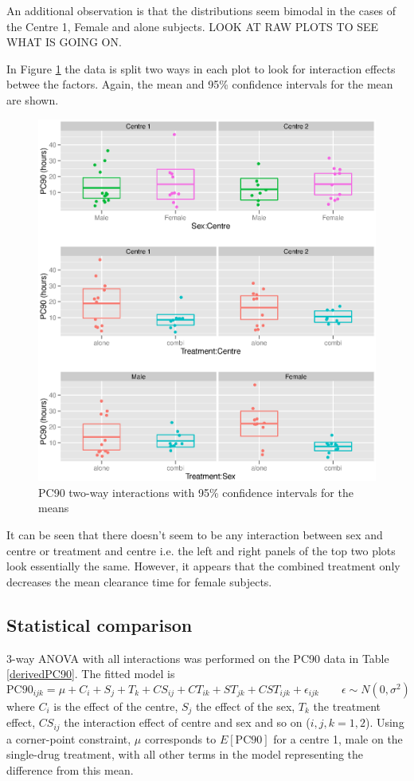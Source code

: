 An additional observation is that the distributions seem bimodal in the cases of the Centre 1, Female and alone subjects. LOOK AT RAW PLOTS TO SEE WHAT IS GOING ON.

In Figure \ref{pc90interaction} the data is split two ways in each plot to look for interaction effects betwee the factors. Again, the mean and 95\% confidence intervals for the mean are shown.
\begin{figure}[ht]
\includegraphics[width=6.5in]{pc90interaction.eps} 
\caption{PC90 two-way interactions with 95\% confidence intervals for the means}
\label{pc90interaction}
\end{figure}

It can be seen that there doesn't seem to be any interaction between sex and centre or treatment and centre i.e. the left and right panels of the top two plots look essentially the same. However, it appears that the combined treatment only decreases the mean clearance time for female subjects.
\subsection{Statistical comparison}
3-way ANOVA with all interactions was performed on the PC90 data in Table \ref{derivedPC90}. The fitted model is
\begin{equation}
\mathrm{PC}90_{ijk}=\mu+C_i+S_j+T_k+CS_{ij}+CT_{ik}+ST_{jk}+CST_{ijk}+\epsilon_{ijk}\quad\quad\epsilon\sim N(0,\sigma^2)\label{full}
\end{equation}
where $C_i$ is the effect of the centre, $S_j$ the effect of the sex, $T_k$ the treatment effect, $CS_{ij}$ the interaction effect of centre and sex and so on ($i,j,k=1,2$). Using a corner-point constraint, $\mu$ corresponds to $E[\mathrm{PC}90]$ for a centre 1, male on the single-drug treatment, with all other terms in the model representing the difference from this mean.

